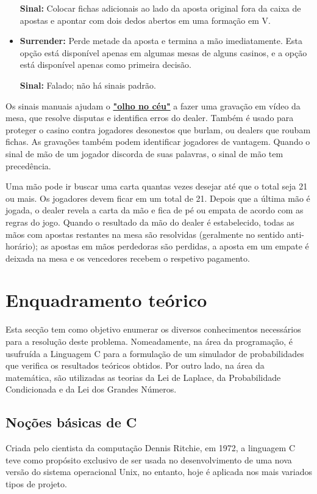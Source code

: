 \documentclass{report}
\begin{document}
\begin{itemize}
\newline \textbf{Sinal:} Colocar fichas adicionais ao lado da aposta original fora da caixa de apostas e apontar com dois dedos abertos em uma formação em V.
    \item \hypertarget{Decisões do jogador}{\textbf{Surrender:} Perde metade da aposta e termina a mão imediatamente. Esta opção está disponível apenas em algumas mesas de alguns casinos, e a opção está disponível apenas como primeira decisão.}\newline
\newline \textbf{Sinal:} Falado; não há sinais padrão.\newline
\end{itemize} 


Os sinais manuais ajudam o \hyperlink{Glossário}{\textbf{"olho no céu"}} a fazer uma gravação em vídeo da mesa, que resolve disputas e identifica erros do dealer. Também é usado para proteger o casino contra jogadores desonestos que burlam, ou dealers que roubam fichas. As gravações também podem identificar jogadores de vantagem. Quando o sinal de mão de um jogador discorda de suas palavras, o sinal de mão tem precedência.

Uma mão pode ir buscar uma carta quantas vezes desejar até que o total seja 21 ou mais. Os jogadores devem ficar em um total de 21. Depois que a última mão é jogada, o dealer revela a carta da mão e fica de pé ou empata de acordo com as regras do jogo. Quando o resultado da mão do dealer é estabelecido, todas as mãos com apostas restantes na mesa são resolvidas (geralmente no sentido anti-horário); as apostas em mãos perdedoras são perdidas, a aposta em um empate é deixada na mesa e os vencedores recebem o respetivo pagamento.\cite{rules}






\chapter{Enquadramento teórico}
\label{chap.Enquadramento teórico}
Esta secção tem como objetivo enumerar os diversos conhecimentos necessários para a resolução deste problema. Nomeadamente, na área da programação, é usufruída a Linguagem C para a formulação de um simulador de probabilidades que verifica os resultados teóricos obtidos. Por outro lado, na área da matemática, são utilizadas as teorias da Lei de Laplace, da Probabilidade Condicionada e da Lei dos Grandes Números.

\section{Noções básicas de C}
Criada pelo cientista da computação Dennis Ritchie, em 1972, a linguagem C teve como propósito exclusivo de ser usada no desenvolvimento de uma nova versão do sistema operacional Unix, no entanto, hoje é aplicada nos mais variados tipos de projeto.
\end{document}
